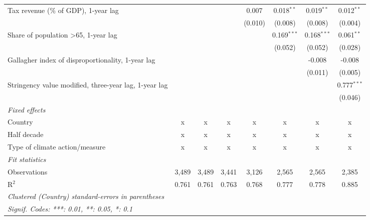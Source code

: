 \begin{tabular}{lccccccc}
   Tax revenue (\% of GDP), 1-year lag                         &              &              &              & 0.007   & 0.018$^{**}$  & 0.019$^{**}$  & 0.012$^{**}$\\   
                                                               &              &              &              & (0.010) & (0.008)       & (0.008)       & (0.004)\\   
   Share of population >65, 1-year lag                         &              &              &              &         & 0.169$^{***}$ & 0.168$^{***}$ & 0.061$^{**}$\\   
                                                               &              &              &              &         & (0.052)       & (0.052)       & (0.028)\\   
   Gallagher index of disproportionality, 1-year lag           &              &              &              &         &               & -0.008        & -0.008\\   
                                                               &              &              &              &         &               & (0.011)       & (0.005)\\   
   Stringency value modified, three-year lag, 1-year lag       &              &              &              &         &               &               & 0.777$^{***}$\\   
                                                               &              &              &              &         &               &               & (0.046)\\   
   \emph{Fixed effects}\\
   Country                                                     & x            & x            & x            & x       & x             & x             & x\\  
   Half decade                                                 & x            & x            & x            & x       & x             & x             & x\\  
   Type of climate action/measure                              & x            & x            & x            & x       & x             & x             & x\\  
   \midrule \emph{Fit statistics}\\
   Observations                                                & 3,489        & 3,489        & 3,441        & 3,126   & 2,565         & 2,565         & 2,385\\  
   R$^2$                                                       & 0.761        & 0.761        & 0.763        & 0.768   & 0.777         & 0.778         & 0.885\\  
   \midrule
   \multicolumn{8}{l}{\emph{Clustered (Country) standard-errors in parentheses}}\\
   \multicolumn{8}{l}{\emph{Signif. Codes: ***: 0.01, **: 0.05, *: 0.1}}\\
\end{tabular}
\par\endgroup


